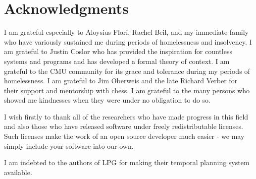 \documentclass[letterpaper]{article}
\begin{document}

\section{Acknowledgments}

\noindent I am grateful especially to Aloysius Flori, Rachel Beil, and
my immediate family who have variously sustained me during periods of
homelessness and insolvency.  I am grateful to Justin Coslor who has
provided the inspiration for countless systems and programs and has
developed a formal theory of context.  I am grateful to the CMU
community for its grace and tolerance during my periods of
homelessness.  I am grateful to Jim Oberweis and the late Richard
Verber for their support and mentorship with chess.  I am grateful to
the many persons who showed me kindnesses when they were under no
obligation to do so.

I wish firstly to thank all of the researchers who have made progress
in this field and also those who have released software under freely
redistributable licenses.  Such licenses make the work of an open
source developer much easier - we may simply include your software
into our own.

I am indebted to the authors of LPG for making their temporal planning
system available.









\end{document}
